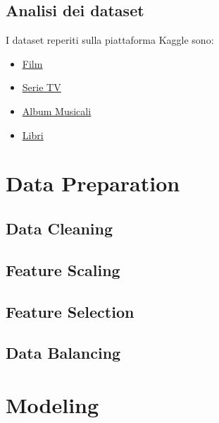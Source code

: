 \documentclass[a4paper, 12pt]{report}
\begin{document}
        \section{Analisi dei dataset}\label{sec:analisi-dei-dataset}
            I dataset reperiti sulla piattaforma Kaggle sono:
            \begin{itemize}
                \item \href{https://www.kaggle.com/datasets/stefanoleone992/filmtv-movies-dataset?resource=download}{\underline{Film}}
                \item \href{https://www.kaggle.com/datasets/amritvirsinghx/web-series-ultimate-edition}{\underline{Serie TV}}
                \item \href{https://www.kaggle.com/datasets/lucascantu/top-5000-albums-of-all-time-spotify-features}{\underline{Album Musicali}}
                \item \href{https://www.kaggle.com/datasets/mdhamani/goodreads-books-100k}{\underline{Libri}}
            \end{itemize}



    \chapter{Data Preparation}\label{ch:data-preparation}


        \section{Data Cleaning}\label{sec:data-cleaning}


        \section{Feature Scaling}\label{sec:feature-scaling}


        \section{Feature Selection}\label{sec:feature-selection}


        \section{Data Balancing}\label{sec:data-balancing}


    \chapter{Modeling}\label{ch:modeling}
\end{document}
